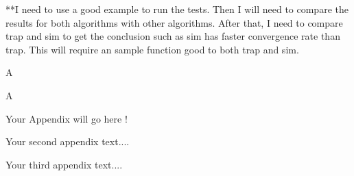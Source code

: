 \documentclass{iitthesis}
\theoremstyle{definition}
\theoremstyle{remark}
\begin{document}
**I need to use a good example to run the tests. Then I will need to compare the results for both algorithms with other algorithms. After that, I need to compare trap and sim to get the conclusion such as sim has faster convergence rate than trap. This will require an sample function good to both trap and sim.



A



A

\clearpage


%
%

\appendix



Your Appendix will go here !



Your second appendix text....


Your third appendix text....
%
%

%
%
%
\end{document}
